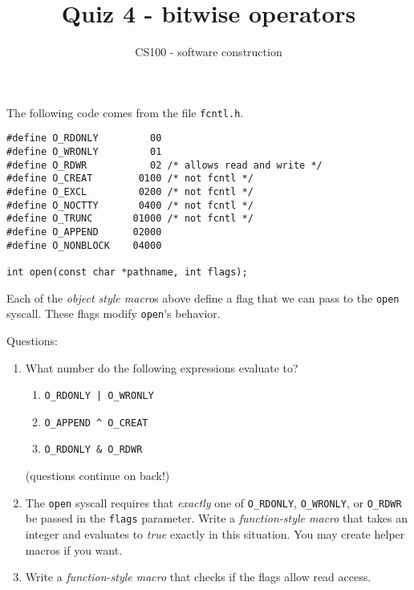 \documentclass{article}
\title{Quiz 4 - bitwise operators}
\author{CS100 - software construction}
\begin{document}
\maketitle

\noindent
The following code comes from the file \lstinline{fcntl.h}.
\begin{verbatim}
#define O_RDONLY         00
#define O_WRONLY         01
#define O_RDWR           02 /* allows read and write */
#define O_CREAT        0100 /* not fcntl */
#define O_EXCL         0200 /* not fcntl */
#define O_NOCTTY       0400 /* not fcntl */
#define O_TRUNC       01000 /* not fcntl */
#define O_APPEND      02000
#define O_NONBLOCK    04000

int open(const char *pathname, int flags);
\end{verbatim}
Each of the \emph{object style macro}s above define a flag that we can pass to the \lstinline{open} syscall.
These flags modify \lstinline{open}'s behavior.

\vspace{0.5in}
\noindent
Questions:
\begin{enumerate}
\item
What number do the following expressions evaluate to?

\begin{enumerate}
\item \lstinline{O_RDONLY | O_WRONLY}
\vspace{1.0in}

\item \lstinline{O_APPEND ^ O_CREAT}
\vspace{1.0in}

\item \lstinline{O_RDONLY & O_RDWR}
\vspace{1.0in}

\end{enumerate}
(questions continue on back!)
\newpage
\item
The \lstinline{open} syscall requires that \emph{exactly} one of
\lstinline{O_RDONLY},
\lstinline{O_WRONLY}, or
\lstinline{O_RDWR}
be passed in the \lstinline{flags} parameter.
Write a \emph{function-style macro} that takes an integer and evaluates to \emph{true} exactly in this situation.
You may create helper macros if you want.

\vspace{4in}
\item
Write a \emph{function-style macro} that checks if the flags allow read access.

\end{enumerate}
\end{document}
